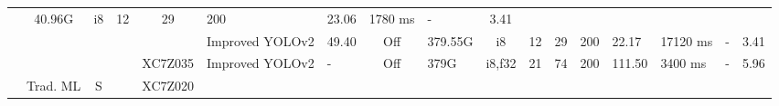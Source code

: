 \begin{table}
\begin{adjustbox}{totalheight=\baselineskip,}
\begin{tabular}{ccccclp{2em}cp{3em}cp{2em}p{4em}p{3em}p{3.5em}p{3.5em}p{2.5em}p{3em}}
                               &\multirow{1}{*}{40.96G}
                                   &\multirow{1}{*}{i8}
                                       &\multirow{1}{*}{12}
                                           &\multirow{1}{*}{29}
                                               &\multirow{1}{*}{200}
                                                   &\multirow{1}{*}{23.06}
                                                       &\multirow{1}{*}{1780 ms}
                                                           &\multirow{1}{*}{-}
                                                               &\multirow{1}{*}{3.41}\\
   &   &   &   &   &\multirow{1}{*}{Improved YOLOv2}
                       &\multirow{1}{*}{49.40}
                           &\multirow{1}{*}{Off}
                               &\multirow{1}{*}{379.55G}
                                   &\multirow{1}{*}{i8}
                                       &\multirow{1}{*}{12}
                                           &\multirow{1}{*}{29}
                                               &\multirow{1}{*}{200}
                                                   &\multirow{1}{*}{22.17}
                                                       &\multirow{1}{*}{17120 ms}
                                                           &\multirow{1}{*}{-}
                                                               &\multirow{1}{*}{3.41}\\
\cmidrule{4-17}
   &   &   &\multirow{1}{*}{\cite{zhangFPGAImplementationCNNbased2021a}}
               &\multirow{1}{*}{XC7Z035}
                   &\multirow{1}{*}{Improved YOLOv2}
                       &\multirow{1}{*}{-}
                           &\multirow{1}{*}{Off}
                               &\multirow{1}{*}{379G}
                                   &\multirow{1}{*}{i8,f32}
                                       &\multirow{1}{*}{21}
                                           &\multirow{1}{*}{74}
                                               &\multirow{1}{*}{200}
                                                   &\multirow{1}{*}{111.50}
                                                       &\multirow{1}{*}{3400 ms}
                                                           &\multirow{1}{*}{-}
                                                               &\multirow{1}{*}{5.96}\\
\cmidrule{2-17}
   &\multirow{7}{*}{Trad. ML}
       &\multirow{7}{*}{S}
           &\multirow{1}{*}{\cite{fraczekEmbeddedVisionSystem2018}}
               &\multirow{1}{*}{XC7Z020}

\end{tabular}
\end{adjustbox}
\end{table}
